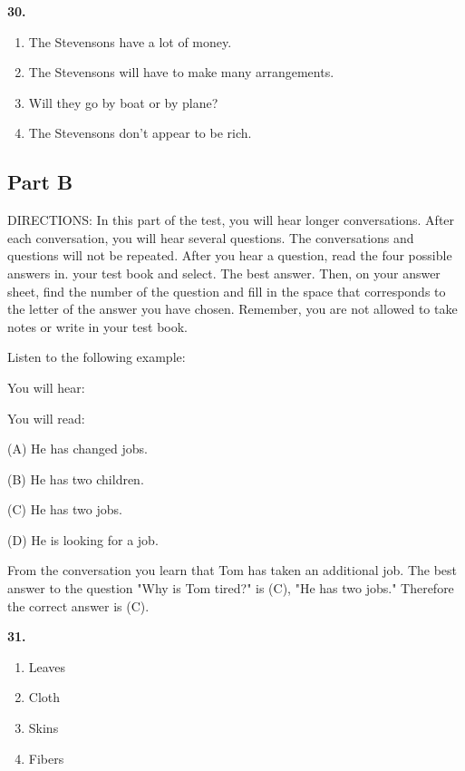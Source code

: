\documentclass[12pt]{article}
\begin{document}
\par
\vspace{0.25\baselineskip}
\noindent\textbf{30.}
\begin{enumerate}[label=(\Alph*),leftmargin=*,itemsep=0.2em]
\item The Stevensons have a lot of money.
\item The Stevensons will have to make many arrangements.
\item Will they go by boat or by plane?
\item The Stevensons don't appear to be rich.
\end{enumerate}
\par
\vspace{0.25\baselineskip}
\subsection*{Part B}
DIRECTIONS: In this part of the test, you will hear longer conversations. After each conversation, you will hear several questions. The conversations and questions will not be repeated. After you hear a question, read the four possible answers in. your test book and select. The best answer. Then, on your answer sheet, find the number of the question and fill in the space that corresponds to the letter of the answer you have chosen. Remember, you are not allowed to take notes or write in your test book.\par
\begin{exampleblock}
Listen to the following example:\par
You will hear:\par
You will read:\par
(A) He has changed jobs.\par
(B) He has two children.\par
(C) He has two jobs.\par
(D) He is looking for a job.\par
From the conversation you learn that Tom has taken an additional job. The best answer to the question "Why is Tom tired?" is (C), "He has two jobs." Therefore the correct answer is (C).\par
\end{exampleblock}
\noindent\textbf{31.}
\begin{enumerate}[label=(\Alph*),leftmargin=*,itemsep=0.2em]
\item Leaves
\item Cloth
\item Skins
\item Fibers
\end{enumerate}
\end{document}
